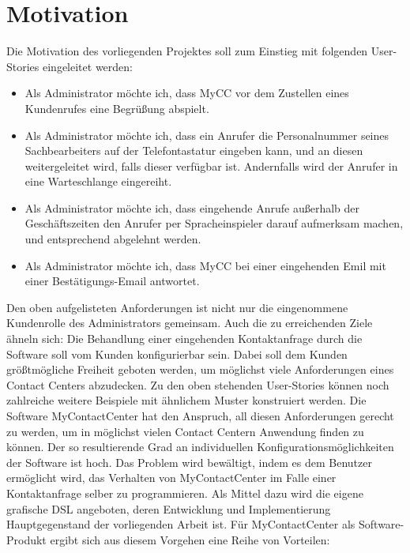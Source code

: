 \section{Motivation}
\label{sec:Motivation}
Die Motivation des vorliegenden Projektes soll zum Einstieg mit folgenden User-Stories eingeleitet werden:
\begin{itemize}
\item Als Administrator möchte ich, dass MyCC vor dem Zustellen eines Kundenrufes eine Begrüßung abspielt.
\item Als Administrator möchte ich, dass ein Anrufer die Personalnummer seines Sachbearbeiters auf der Telefontastatur eingeben kann, und an diesen weitergeleitet wird, falls dieser verfügbar ist. Andernfalls wird der Anrufer in eine Warteschlange eingereiht. 
\item Als Administrator möchte ich, dass eingehende Anrufe außerhalb der Ge\-schäftszeiten den Anrufer per Spracheinspieler darauf aufmerksam machen, und entsprechend abgelehnt werden.
\item Als Administrator möchte ich, dass MyCC bei einer eingehenden Emil mit einer Bestätigungs-Email antwortet.
\end{itemize}
Den oben aufgelisteten Anforderungen ist nicht nur die eingenommene Kundenrolle des Administrators gemeinsam. Auch die zu erreichenden Ziele ähneln sich: Die Behandlung einer eingehenden Kontaktanfrage durch die Software soll vom Kunden konfigurierbar sein. Dabei soll dem Kunden größtmögliche Freiheit geboten werden, um möglichst viele Anforderungen eines Contact Centers abzudecken. Zu den oben stehenden User-Stories können noch zahlreiche weitere Beispiele mit ähnlichem Muster konstruiert werden. Die Software MyContactCenter hat den Anspruch, all diesen Anforderungen gerecht zu werden, um in möglichst vielen Contact Centern Anwendung finden zu können. Der so resultierende Grad an individuellen Konfigurationsmöglichkeiten der Software ist hoch. Das Problem wird bewältigt, indem es dem Benutzer ermöglicht wird, das Verhalten von MyContactCenter im Falle einer Kontaktanfrage selber zu programmieren. Als Mittel dazu wird die eigene grafische DSL angeboten, deren Entwicklung und Implementierung Hauptgegenstand der vorliegenden Arbeit ist.
\newline
Für MyContactCenter als Software-Produkt ergibt sich aus diesem Vorgehen eine Reihe von Vorteilen:

